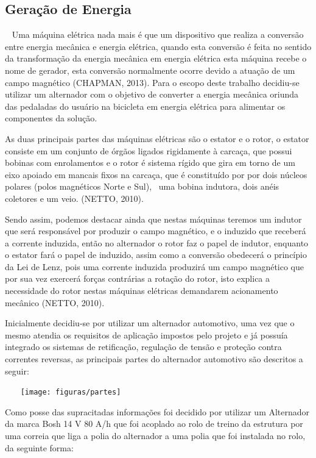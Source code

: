 \subsection{Geração de Energia }  
Uma máquina elétrica nada mais é que um dispositivo que realiza a conversão entre energia mecânica e energia elétrica, quando esta conversão é feita no sentido da transformação da energia mecânica em energia elétrica esta máquina recebe o nome de gerador, esta conversão normalmente ocorre devido a atuação de um campo magnético (CHAPMAN, 2013).
Para o escopo deste trabalho decidiu-se utilizar um alternador com o objetivo de converter a energia mecânica oriunda das pedaladas do usuário na bicicleta em energia elétrica para alimentar os componentes da solução.

As duas principais partes das máquinas elétricas são o estator e o rotor, o estator consiste em um conjunto de órgãos ligados rigidamente à carcaça, que possui bobinas com enrolamentos e o rotor é sistema rígido que gira em torno de um eixo apoiado em mancais fixos na carcaça, que é constituído por por dois núcleos polares (polos magnéticos Norte e Sul),  uma bobina indutora, dois anéis coletores e um veio. (NETTO, 2010).

Sendo assim, podemos destacar ainda que nestas máquinas teremos um indutor que será responsável por produzir o campo magnético, e o induzido que receberá a corrente induzida, então no alternador o rotor faz o papel de indutor, enquanto o estator fará o papel de induzido, assim como a conversão obedecerá o princípio da Lei de Lenz, pois uma corrente induzida produzirá um campo magnético que por sua vez exercerá forças contrárias a rotação do rotor, isto explica a necessidade do rotor nestas máquinas elétricas demandarem acionamento mecânico (NETTO, 2010).

Inicialmente decidiu-se por utilizar um alternador automotivo, uma vez que o mesmo atendia os requisitos de aplicação impostos pelo projeto e já possuía integrado os sistemas de retificação, regulação de tensão e proteção contra correntes reversas, as principais partes do alternador automotivo são descritos a seguir:

\begin{center}
    \texttt{[image: figuras/partes]}
       \label{partes}
   \end{center}

Como posse das supracitadas informações foi decidido por utilizar um Alternador da marca Bosh 14 V 80 A/h que foi acoplado ao rolo de treino da estrutura por uma correia que liga a polia do alternador a uma polia que foi instalada no rolo, da seguinte forma:


